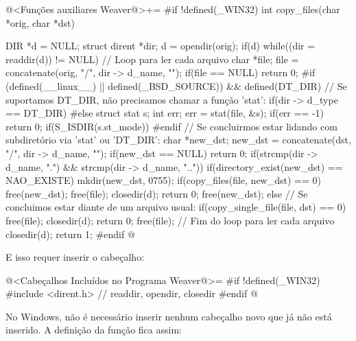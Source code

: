 \iniciocodigo
@<Funções auxiliares Weaver@>+=
#if !defined(_WIN32)
int copy_files(char *orig, char *dst){
  DIR *d = NULL;
  struct dirent *dir;
  d = opendir(orig);
  if(d){
    while((dir = readdir(d)) != NULL){ // Loop para ler cada arquivo
      char *file;
      file = concatenate(orig, "/", dir -> d_name, "");
      if(file == NULL){
        return 0;
      }
#if (defined(__linux__) || defined(_BSD_SOURCE)) && defined(DT_DIR)
      // Se suportamos DT_DIR, não precisamos chamar a função 'stat':
      if(dir -> d_type == DT_DIR){
#else
      struct stat s;
      int err;
      err = stat(file, &s);
      if(err == -1) return 0;
      if(S_ISDIR(s.st_mode)){
#endif
      // Se concluirmos estar lidando com subdiretório via 'stat' ou 'DT_DIR':
        char *new_dst;
        new_dst = concatenate(dst, "/", dir -> d_name, "");
        if(new_dst == NULL){
          return 0;
        }
        if(strcmp(dir -> d_name, ".") && strcmp(dir -> d_name, "..")){
          if(directory_exist(new_dst) == NAO_EXISTE) mkdir(new_dst, 0755);
          if(copy_files(file, new_dst) == 0){
            free(new_dst);
            free(file);
            closedir(d);
            return 0;
          }
        }
        free(new_dst);
      }
      else{
        // Se concluimos estar diante de um arquivo usual:
        if(copy_single_file(file, dst) == 0){
          free(file);
          closedir(d);
          return 0;
        }
      }
    free(file);
    } // Fim do loop para ler cada arquivo
    closedir(d);
  }
  return 1;
}
#endif
@
\fimcodigo

E isso requer inserir o cabeçalho:

\iniciocodigo
@<Cabeçalhos Incluídos no Programa Weaver@>=
#if !defined(_WIN32)
#include <dirent.h> // readdir, opendir, closedir
#endif
@
\fimcodigo

No Windows, não é necessário inserir nenhum cabeçalho novo que já não
está inserido. A definição da função fica assim:

}
